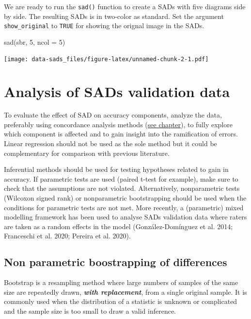\documentclass[
  letterpaper,
]{book}
\newenvironment{Shaded}{\begin{snugshade}}{\end{snugshade}}
\newcommand{\AttributeTok}[1]{\textcolor[rgb]{0.40,0.45,0.13}{#1}}
\newcommand{\DecValTok}[1]{\textcolor[rgb]{0.68,0.00,0.00}{#1}}
\newcommand{\FunctionTok}[1]{\textcolor[rgb]{0.28,0.35,0.67}{#1}}
\newcommand{\NormalTok}[1]{\textcolor[rgb]{0.00,0.23,0.31}{#1}}
\begin{document}
We are ready to run the \texttt{sad()} function to create a SADs with
five diagrams side by side. The resulting SADs is in two-color as
standard. Set the argument \texttt{show\_original} to \texttt{TRUE} for
showing the orignal image in the SADs.

\begin{Shaded}
\begin{Highlighting}[]
\FunctionTok{sad}\NormalTok{(sbr, }\DecValTok{5}\NormalTok{, }\AttributeTok{ncol =} \DecValTok{5}\NormalTok{)}
\end{Highlighting}
\end{Shaded}

\texttt{[image: data-sads\_files/figure-latex/unnamed-chunk-2-1.pdf]}

\hypertarget{analysis-of-sads-validation-data}{%
\section{Analysis of SADs validation
data}\label{analysis-of-sads-validation-data}}

To evaluate the effect of SAD on accuracy components, analyze the data,
preferably using concordance analysis methods
(\href{data-accuracy.html}{see chapter}), to fully explore which
component is affected and to gain insight into the ramification of
errors. Linear regression should not be used as the sole method but it
could be complementary for comparison with previous literature.

Inferential methods should be used for testing hypotheses related to
gain in accuracy. If parametric tests are used (paired t-test for
example), make sure to check that the assumptions are not violated.
Alternatively, nonparametric tests (Wilcoxon signed rank) or
nonparametric bootstrapping should be used when the conditions for
parametric tests are not met. More recently, a (parametric) mixed
modelling framework has been used to analyse SADs validation data where
raters are taken as a random effects in the model (González-Domínguez et
al. 2014; Franceschi et al. 2020; Pereira et al. 2020).

\hypertarget{non-parametric-boostrapping-of-differences}{%
\subsection{Non parametric boostrapping of
differences}\label{non-parametric-boostrapping-of-differences}}

Bootstrap is a resampling method where large numbers of samples of the
same size are repeatedly drawn, \textbf{\emph{with replacement}}, from a
single original sample. It is commonly used when the distribution of a
statistic is unknown or complicated and the sample size is too small to
draw a valid inference.
\end{document}
